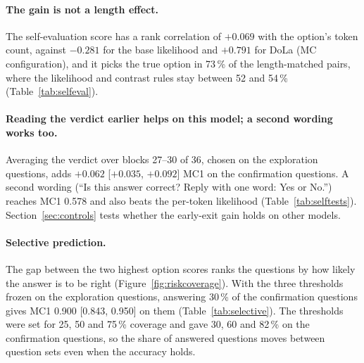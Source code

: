 \documentclass[11pt]{article}
\begin{document}
\begin{table}[t]
\centering\small\setlength{\tabcolsep}{3.5pt}
\caption{Paired comparisons on the 400 confirmation questions, as frozen before they were scored: three main
comparisons and two ablations. $p$: exact McNemar on MC1, Holm-adjusted over all 20 $p$-values of the design. MC2
and MC3: mean differences, all with 95\,\% intervals that exclude 0.}
\label{tab:selftests}
\end{table}

\paragraph{The gain is not a length effect.}
The self-evaluation score has a rank correlation of $+0.069$ with the option's token count, against $-0.281$ for
the base likelihood and $+0.791$ for DoLa (MC configuration), and it picks the true option in 73\,\% of the
length-matched pairs, where the likelihood and contrast rules stay between 52 and 54\,\% (Table~\ref{tab:selfeval}).

\paragraph{Reading the verdict earlier helps on this model; a second wording works too.}
Averaging the verdict over blocks 27--30 of 36, chosen on the exploration questions, adds $+0.062$ [$+0.035$,
$+0.092$] MC1 on the confirmation questions. A second wording (``Is this answer correct? Reply with one word: Yes
or No.'') reaches MC1 0.578 and also beats the per-token likelihood (Table~\ref{tab:selftests}). Section~\ref{sec:controls}
tests whether the early-exit gain holds on other models.

\paragraph{Selective prediction.}
The gap between the two highest option scores ranks the questions by how likely the answer is to be right
(Figure~\ref{fig:riskcoverage}). With the three thresholds frozen on the exploration questions, answering 30\,\% of
the confirmation questions gives MC1 0.900 [0.843, 0.950] on them (Table~\ref{tab:selective}). The thresholds were
set for 25, 50 and 75\,\% coverage and gave 30, 60 and 82\,\% on the confirmation questions, so the share of
answered questions moves between question sets even when the accuracy holds.
\end{document}
